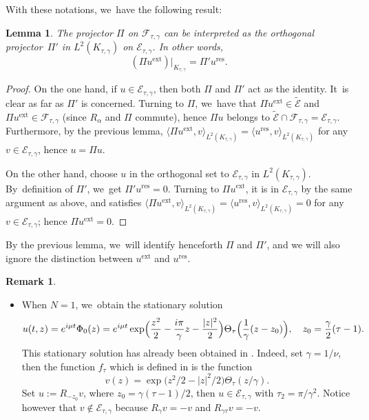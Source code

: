 \documentclass[10pt]{amsart}
\newcommand{\skpt}{\par\smallskip\noindent}
\newcommand{\ext}{\mathrm{ext}}
\newcommand{\res}{\mathrm{res}}
\newtheorem{lemme}[theorem]{Lemma}
\theoremstyle{definition}
\newtheorem{remark}[theorem]{Remark}
\let\EE\exp
\begin{document}
With these notations, we~have the following result:

\begin{lemme} \label{lemmaproj2}
The projector $\Pi$ on $\mathcal{F}_{\tau,\gamma}$ can be interpreted as the orthogonal projector~$\Pi'$ in $L^2(K_{\tau,\gamma})$ on $\mathcal{E}_{\tau,\gamma}$. In other words,
\[
(\Pi u^{\ext})\big|_{K_{\tau,\gamma}} = \Pi' u^{\res}.
\]
\end{lemme}

\begin{proof} On the one hand, if $u \in \mathcal{E}_{\tau,\gamma}$, then both $\Pi$ and $\Pi'$ act as the identity. It~is clear as far as $\Pi'$ is concerned. Turning to $\Pi$, we~have that $\Pi u^{\ext} \in \widetilde{\mathcal{E}}$ and $\Pi u^{\ext} \in \mathcal{F}_{\tau,\gamma}$ (since $R_\alpha$ and $\Pi$ commute), hence $\Pi u$ belongs to $\widetilde{\mathcal{E}} \cap \mathcal{F}_{\tau,\gamma} = \mathcal{E}_{\tau,\gamma}$. Furthermore, by the previous lemma, $\langle \Pi u^{\ext}, v \rangle_{L^2(K_{\tau,\gamma})} = \langle u^{\res}, v \rangle_{L^2(K_{\tau,\gamma})}$ for any $v \in \mathcal{E}_{\tau,\gamma}$, hence $u = \Pi u$.

On the other hand, choose $u$ in the orthogonal set to $\mathcal{E}_{\tau,\gamma}$ in $L^2(K_{\tau,\gamma})$. By~definition of $\Pi'$, we~get $\Pi' u^{\res} = 0$. Turning to $\Pi u^{\ext}$, it is in $\mathcal{E}_{\tau,\gamma}$ by the same argument as above, and satisfies $\langle \Pi u^{\ext}, v \rangle_{L^2(K_{\tau,\gamma})} = \langle u^{\res}, v \rangle_{L^2(K_{\tau,\gamma})}=0$ for any $v \in \mathcal{E}_{\tau,\gamma}$; hence $\Pi u^{\ext} = 0$.
\end{proof}

By the previous lemma, we~will identify henceforth $\Pi$ and $\Pi'$, and we will also ignore the distinction between $u^{\ext}$ and $u^{\res}$.
\skpt\begin{remark}\label{rem14}
\begin{itemize}
\item
When $N=1$, we~obtain the stationary solution
\begin{equation*}
u(t,z)= e^{i\mu t}\Phi_0(z) =e^{i\mu t}\EE\Bigl({ \frac{z^2}2 -\frac{i\pi}{\gamma} z - \frac{|z|^2}2}\Bigr) \Theta_{\tau}\Bigl(\frac{1}{\gamma}(z-z_0)\Bigr), \quad z_0 = \frac{\gamma}{2}(\tau-1).
\end{equation*}
This stationary solution has already been obtained in \cite{ABN}. Indeed, set $\gamma=1/{\nu}$, then the function $f_\tau$ which is defined in \cite[Th.\,1.4]{ABN} is the function
\[
v(z)=\EE\bigl(z^2/2-|z|^2/2\bigr)\Theta_\tau({z}/{\gamma}).
\]
Set $u:=R_{-z_0}v$, where $z_0 = {\gamma}(\tau-1)/2$, then $u \in \mathcal{E}_{\tau,\gamma}$ with $\tau_2=\pi/\gamma^2$. Notice however that $v \notin \mathcal{E}_{\tau,\gamma}$ because $ R_\gamma v=-v$ and $ R_{\gamma \tau} v=-v$.
\end{itemize}
\end{remark}
\end{document}

